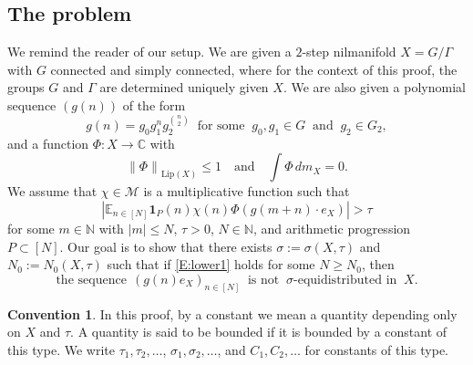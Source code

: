 \documentclass[11pt]{amsart}
\theoremstyle{definition}
\newtheorem*{convention}{Convention}
\begin{document}
\subsection{The problem}
We remind the reader of our setup.
We are given a $2$-step nilmanifold $X=G/\Gamma$   with $G$ connected and simply connected, where for the context of this proof, the groups $G$ and $\Gamma$ are determined uniquely given $X$.
We are also given a polynomial sequence $(g(n))$ of the form
$$
g(n)=g_0g_1^ng_2^{\binom n2}\ \text{ for some }\ g_0,g_1\in G\ \text{ and }\ g_2\in G_2,
$$
and a function $\Phi\colon X\to {{\mathbb C}}$   with
$$
{\lVert {\Phi} \rVert}_{\text{Lip}(X)}\leq 1
\quad \text{and}  \quad \int \Phi\, dm_X=0.
$$
 We assume that
 $\chi\in {{\mathcal M}}$ is a multiplicative function such that
\begin{equation}\label{E:lower1}
|{{\mathbb E}}_{n\in[N]} {\mathbf{1}}_P(n)
\chi(n)\Phi(g(m+n)\cdot e_X)|>\tau
\end{equation}
for some $m\in {{\mathbb N}}$ with $|m|\leq N$, $\tau>0$, $N\in {{\mathbb N}}$,
and  arithmetic
progression $P\subset[N]$.
Our goal is to show  that there exists $\sigma:=\sigma(X, \tau)$ and $N_0:=N_0(X,\tau)$ such that
 if \eqref{E:lower1} holds for some $N\geq N_0$, then
\begin{equation}
\label{eq:conclusion}
\text{the sequence} \  \ (g(n)e_X)_{n\in [N]} \
\text{ is not } \   \sigma\text{-equidistributed in } \  X.
\end{equation}
\begin{convention}
In this proof, by a constant we mean a quantity depending only on $X$ and $\tau$.
A quantity is said to be bounded if it is bounded by a constant of this type.
We write $\tau_1,\tau_2,\dots$, $\sigma_1,\sigma_2,\dots$, and $C_1,C_2,\dots$ for constants of this type.
\end{convention}
\end{document}
